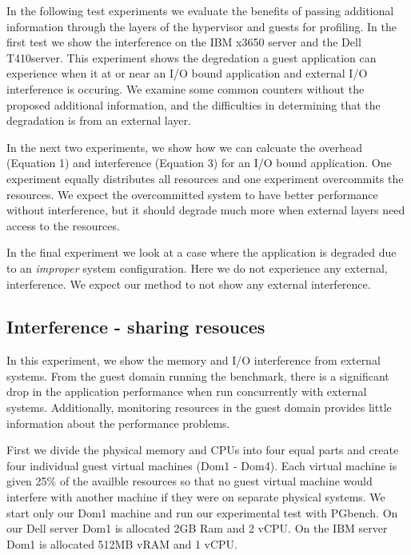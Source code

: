 In the following test experiments we evaluate the benefits of passing additional information through the layers of the hypervisor and guests for profiling. 
In the first test we show the interference on the IBM x3650 server and the Dell T410server.  
This experiment shows the degredation a guest application can experience when it at or near an I/O bound application and external I/O interference is occuring.
We examine some common counters without the proposed additional information, and the difficulties in determining that the degradation is from an external layer.

In the next two experiments, we show how we can calcuate the overhead (Equation 1) and interference (Equation 3) for an I/O bound application.  One experiment equally distributes all resources and one experiment overcommits the resources.  We expect the overcommitted system to have better performance without interference, but it should degrade much more when external layers need access to the resources.

In the final experiment we look at a case where the application is degraded due to an \emph{improper} system configuration.  Here we do not experience any external, interference.  We expect our method to not show any external interference.

\subsection{Interference - sharing resouces}
In this experiment, we show the memory and I/O interference from external systems.
From the guest domain running the benchmark, there is a significant drop in the application performance when run concurrently with external systems.  
Additionally, monitoring resources in the guest domain provides little information about the performance problems. 

First we divide the physical memory and CPUs into four equal parts and create four individual guest virtual machines (Dom1 - Dom4).  Each virtual machine is given 25\% of the availble resources so that no guest virtual machine would interfere with another machine if they were on separate physical systems.  We start only our Dom1 machine and run our experimental test with PGbench.  On our Dell server Dom1 is allocated 2GB Ram and 2 vCPU.  On the IBM server Dom1 is allocated 512MB vRAM and 1 vCPU.  

